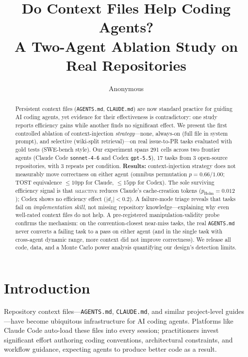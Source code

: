 \documentclass[11pt]{article}
\title{Do Context Files Help Coding Agents?\\A Two-Agent Ablation Study on Real Repositories}
\author{Anonymous}
\newcommand{\agentsmd}{\texttt{AGENTS.md}}
\newcommand{\selective}{\textsc{selective}}
\begin{document}
\maketitle

\begin{abstract}
Persistent context files (\agentsmd{}, \texttt{CLAUDE.md}) are now standard practice for guiding AI coding agents, yet evidence for their effectiveness is contradictory: one study reports efficiency gains while another finds no significant effect.
We present the first controlled ablation of context-injection \emph{strategy}---none, always-on (full file in system prompt), and selective (wiki-split retrieval)---on real issue-to-PR tasks evaluated with gold tests (SWE-bench style).
Our experiment spans 291 cells across two frontier agents (Claude Code \texttt{sonnet-4-6} and Codex \texttt{gpt-5.5}), 17 tasks from 3 open-source repositories, with 3 repeats per condition.
\textbf{Results:} context-injection strategy does not measurably move correctness on either agent (omnibus permutation $p{=}0.66$/$1.00$; TOST equivalence ${\leq}10$pp for Claude, ${\leq}15$pp for Codex).
The sole surviving efficiency signal is that \selective{} reduces Claude's cache-creation tokens ($p_{\text{Holm}}{=}0.012$); Codex shows no efficiency effect ($|d_z|{<}0.2$).
A failure-mode triage reveals that tasks fail on \emph{implementation skill}, not missing repository knowledge---explaining why even well-rated context files do not help.
A pre-registered manipulation-validity probe confirms the mechanism: on the convention-closest near-miss tasks, the real \agentsmd{} never converts a failing task to a pass on either agent (and in the single task with cross-agent dynamic range, more context did not improve correctness).
We release all code, data, and a Monte Carlo power analysis quantifying our design's detection limits.
\end{abstract}

\section{Introduction}

Repository context files---\agentsmd{}, \texttt{CLAUDE.md}, and similar project-level guides---have become ubiquitous infrastructure for AI coding agents.
Platforms like Claude Code auto-load these files into every session; practitioners invest significant effort authoring coding conventions, architectural constraints, and workflow guidance, expecting agents to produce better code as a result.
\end{document}
